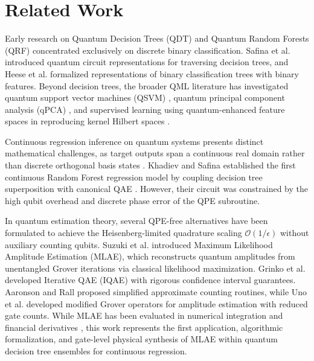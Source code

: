 \documentclass[sn-mathphys,Numbered]{sn-jnl}
\theoremstyle{thmstyleone}
\theoremstyle{thmstyletwo}
\theoremstyle{thmstylethree}
\begin{document}
\section{Related Work}\label{sec2}

Early research on Quantum Decision Trees (QDT) and Quantum Random Forests (QRF) concentrated exclusively on discrete binary classification. Safina et al. \cite{safina2023quantum} introduced quantum circuit representations for traversing decision trees, and Heese et al. \cite{heese2022representation} formalized representations of binary classification trees with binary features. Beyond decision trees, the broader QML literature has investigated quantum support vector machines (QSVM) \cite{rebentrost2014quantum}, quantum principal component analysis (qPCA) \cite{lloyd2014quantum}, and supervised learning using quantum-enhanced feature spaces in reproducing kernel Hilbert spaces \cite{schuld2019quantum,havlicek2019supervised}.

Continuous regression inference on quantum systems presents distinct mathematical challenges, as target outputs span a continuous real domain rather than discrete orthogonal basis states \cite{wiebe2012quantum,mitarai2018quantum}. Khadiev and Safina \cite{khadiev2026quantum} established the first continuous Random Forest regression model by coupling decision tree superposition with canonical QAE \cite{brassard2002quantum}. However, their circuit was constrained by the high qubit overhead and discrete phase error of the QPE subroutine.

In quantum estimation theory, several QPE-free alternatives have been formulated to achieve the Heisenberg-limited quadrature scaling $\mathcal{O}(1/\epsilon)$ without auxiliary counting qubits. Suzuki et al. \cite{suzuki2020amplitude} introduced Maximum Likelihood Amplitude Estimation (MLAE), which reconstructs quantum amplitudes from unentangled Grover iterations via classical likelihood maximization. Grinko et al. \cite{grinko2021iterative} developed Iterative QAE (IQAE) with rigorous confidence interval guarantees. Aaronson and Rall \cite{aaronson2020quantum} proposed simplified approximate counting routines, while Uno et al. \cite{uno2021efficient} developed modified Grover operators for amplitude estimation with reduced gate counts. While MLAE has been evaluated in numerical integration and financial derivatives \cite{suzuki2020amplitude,tanaka2022amplitude}, this work represents the first application, algorithmic formalization, and gate-level physical synthesis of MLAE within quantum decision tree ensembles for continuous regression.
\end{document}
